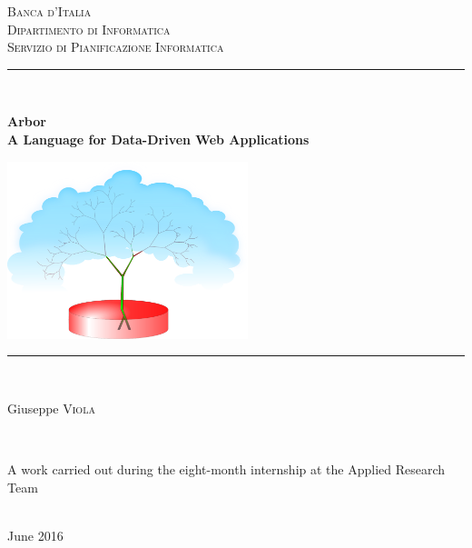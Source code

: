 \documentclass[12pt]{article} %
\newcommand{\A}{Arbor}
\begin{document}
\begin{titlepage}

\newcommand{\HsRule}{\rule{\linewidth}{0.5mm}} %

\center %

\textsc{\LARGE Banca d'Italia}\\[1.5cm] %
\textsc{\Large Dipartimento di Informatica}\\[0.5cm] %
\textsc{\large Servizio di Pianificazione Informatica}\\[0.5cm] %

\HsRule \\[0.4cm]
{ \huge \bfseries \A{} \\
\normalsize A Language for Data-Driven Web Applications
\begin{center}
\includegraphics[width=7cm]{complete.pdf}
%
\end{center}
}%
\HsRule \\[1.5cm]

\begin{minipage}{0.4\textwidth}
\begin{flushleft}
Giuseppe \textsc{Viola} %
\end{flushleft}
\end{minipage}
~
\begin{minipage}{0.4\textwidth}
\begin{flushright}
A work carried out during the eight-month internship at the \linebreak Applied Research Team
\end{flushright}
\end{minipage}\\[3cm]

{\large June 2016}\\[3cm] %


\vfill %

\end{titlepage}
\end{document}
